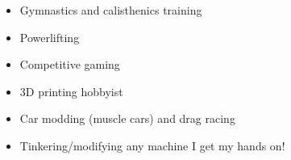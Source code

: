 \documentclass[10pt]{article} %
\begin{document}
\begin{paracol}{2} %

	\begin{itemize}\itemsep0em 
		\item Gymnastics and calisthenics training
		\item Powerlifting
		\item Competitive gaming	
	\end{itemize}
		
	
	\switchcolumn %
	

	\begin{itemize}\itemsep0em 
		\item 3D printing hobbyist
		\item Car modding (muscle cars) and drag racing
		\item Tinkering/modifying any machine I get my hands on!		
	\end{itemize}

	
\end{paracol}

\medskip %

\end{document}

